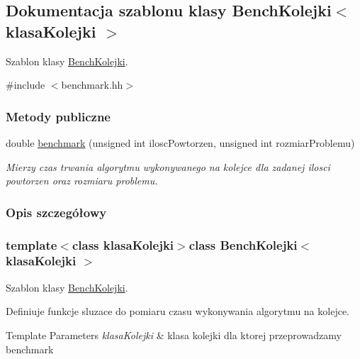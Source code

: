 \hypertarget{class_bench_kolejki}{\subsection{Dokumentacja szablonu klasy Bench\-Kolejki$<$ klasa\-Kolejki $>$}
\label{class_bench_kolejki}
}


Szablon klasy \hyperlink{class_bench_kolejki}{Bench\-Kolejki}.  




{\ttfamily \#include $<$benchmark.\-hh$>$}

\subsubsection*{Metody publiczne}
\begin{DoxyCompactItemize}
\item 
double \hyperlink{class_bench_kolejki_ad19561a2d771efd50724ce20f1d5ef64}{benchmark} (unsigned int ilosc\-Powtorzen, unsigned int rozmiar\-Problemu)
\begin{DoxyCompactList}\small\item\em Mierzy czas trwania algorytmu wykonywanego na kolejce dla zadanej ilosci powtorzen oraz rozmiaru problemu. \end{DoxyCompactList}\end{DoxyCompactItemize}


\subsubsection{Opis szczegółowy}
\subsubsection*{template$<$class klasa\-Kolejki$>$class Bench\-Kolejki$<$ klasa\-Kolejki $>$}

Szablon klasy \hyperlink{class_bench_kolejki}{Bench\-Kolejki}. 

Definiuje funkcje sluzace do pomiaru czasu wykonywania algorytmu na kolejce. 
\begin{DoxyTemplParams}{Template Parameters}
{\em klasa\-Kolejki} & klasa kolejki dla ktorej przeprowadzamy benchmark \\
\hline
\end{DoxyTemplParams}


